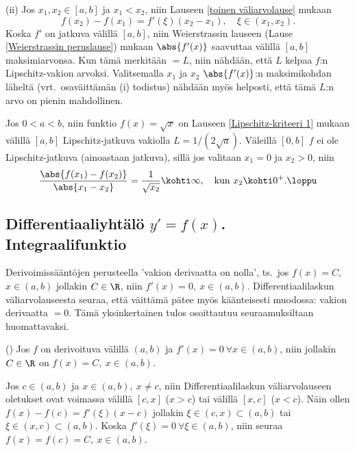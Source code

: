 (ii) Jos $x_1,x_2\in [a,b]$ ja $x_1<x_2$, niin Lauseen \ref{toinen väliarvolause} mukaan
\[
f(x_2)-f(x_1)=f'(\xi)(x_2-x_1),\quad \xi\in (x_1,x_2).
\]
Koska $f'$ on jatkuva välillä $[a,b]$, niin Weierstrassin lauseen (Lause
\ref{Weierstrassin peruslause}) mukaan $\abs{f'(x)}$ saavuttaa välillä $[a,b]$ maksimiarvonsa.
Kun tämä merkitään $=L$, niin nähdään, että $L$ kelpaa $f$:n Lipschitz-vakion arvoksi.
Valitsemalla $x_1$ ja $x_2$ $\abs{f'(x)}$:n maksimikohdan läheltä (vrt.\ osaväittämän (i)
todistus) nähdään myös helposti, että tämä $L$:n arvo on pienin mahdollinen. \loppu
\begin{Exa} Jos $0<a<b$, niin funktio $f(x)=\sqrt{x}$ on Lauseen \ref{Lipschitz-kriteeri 1}
mukaan välillä $[a,b]$ Lipschitz-jatkuva vakiolla $L=1/(2\sqrt{a})$. Väleillä $[0,b]$ $f$ ei
ole Lipschitz-jatkuva (ainoastaan jatkuva), sillä jos valitaan $x_1=0$ ja $x_2>0$, niin
\[
\frac{\abs{f(x_1)-f(x_2)}}{\abs{x_1-x_2}} = \frac{1}{\sqrt{x_2}} \kohti \infty, \quad
                                            \text{kun}\ x_2 \kohti 0^+. \loppu
\]
\end{Exa}

\subsection{Differentiaaliyhtälö $y'=f(x)$. Integraalifunktio}
 

Derivoimissääntöjen perusteella 'vakion derivaatta on nolla', ts.\ jos $f(x)=C$, $x\in(a,b)$
jollakin $C\in\R$, niin $f'(x)=0,\ x\in(a,b)$. Differentiaalilaskun väli\-arvo\-lauseesta 
seuraa, että väittämä pätee myös käänteisesti muodossa:  vakion derivaatta $=0$. 
Tämä yksinkertainen tulos osoittautuu seuraamuksiltaan huomattavaksi.
\begin{Lause} () 
\label{Integraalilaskun peruslause} 
Jos $f$ on derivoituva välillä $(a,b)$ ja $f'(x)=0\ \forall x\in(a,b)$, niin jollakin $C\in\R$
on $f(x)=C,\ x\in(a,b)$.
\end{Lause}
\tod Jos $c\in(a,b)$ ja $x\in(a,b),\ x \neq c$, niin Differentiaalilaskun väliarvolauseen
oletukset ovat voimassa välillä $[c,x]$ ($x>c$) tai välillä $[x,c]$ ($x<c$). Näin ollen
$f(x)-f(c)=f'(\xi)(x-c)$ jollakin $\xi\in(c,x)\subset(a,b)$ tai $\xi\in(x,c)\subset(a,b)$.
Koska $f'(\xi)=0\ \forall\xi\in(a,b)$, niin seuraa $f(x)=f(c)=C,\ x\in(a,b)$. \loppu

